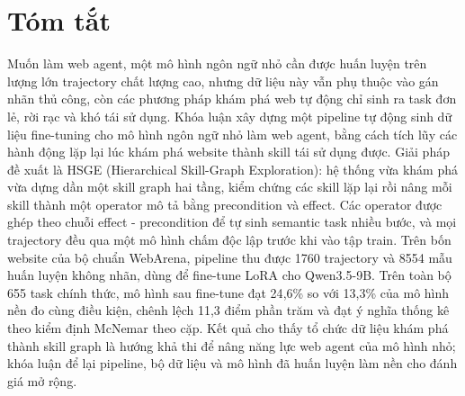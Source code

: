 \chapter*{Tóm tắt}

Muốn làm web agent, một mô hình ngôn ngữ nhỏ cần được huấn luyện trên lượng lớn
trajectory chất lượng cao, nhưng dữ liệu này vẫn phụ thuộc vào gán nhãn thủ
công, còn các phương pháp khám phá web tự động chỉ sinh ra task đơn lẻ, rời
rạc và khó tái sử dụng. Khóa luận xây dựng một pipeline tự động sinh dữ liệu
fine-tuning cho mô hình ngôn ngữ nhỏ làm web agent, bằng cách tích lũy các hành
động lặp lại lúc khám phá website thành skill tái sử dụng được. Giải pháp đề
xuất là HSGE (Hierarchical Skill-Graph Exploration): hệ thống vừa khám phá vừa
dựng dần một skill graph hai tầng, kiểm chứng các skill lặp lại rồi nâng
mỗi skill thành một operator mô tả bằng precondition và effect. Các operator
được ghép theo chuỗi effect - precondition để tự sinh semantic task nhiều
bước, và mọi trajectory đều qua một mô hình chấm độc lập trước khi vào tập
train. Trên bốn website của bộ chuẩn WebArena, pipeline thu được 1760
trajectory và 8554 mẫu huấn luyện không nhãn, dùng để fine-tune LoRA cho
Qwen3.5-9B. Trên toàn bộ 655 task chính thức, mô hình sau fine-tune đạt
24{,}6\% so với 13{,}3\% của mô hình nền đo cùng điều kiện, chênh lệch 11{,}3
điểm phần trăm và đạt ý nghĩa thống kê theo kiểm định McNemar theo cặp. Kết quả
cho thấy tổ chức dữ liệu khám phá thành skill graph là hướng khả thi để nâng
năng lực web agent của mô hình nhỏ; khóa luận để lại pipeline, bộ dữ liệu và mô
hình đã huấn luyện làm nền cho đánh giá mở rộng.
